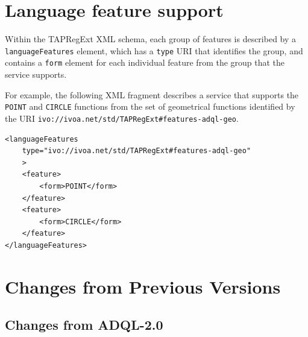 \documentclass[11pt,a4paper]{ivoa}
\begin{document}
\section{Language feature support}
\label{sec:features}

Within the TAPRegExt \citep{std:TAPREGEXT} XML schema, each group of features is
described by a \verb:languageFeatures: element, which has a \verb:type:
URI that identifies the group, and contains a \verb:form: element for each
individual feature from the group that the service supports.

For example, the following XML fragment describes a service that supports the
\verb:POINT: and \verb:CIRCLE: functions from the set of geometrical functions
identified by the URI \verb|ivo://ivoa.net/std/TAPRegExt#features-adql-geo|.

\begin{verbatim}
<languageFeatures
    type="ivo://ivoa.net/std/TAPRegExt#features-adql-geo"
    >
    <feature>
        <form>POINT</form>
    </feature>
    <feature>
        <form>CIRCLE</form>
    </feature>
</languageFeatures>    
\end{verbatim}

\section{Changes from Previous Versions}
\label{sec:changes}
\subsection{Changes from ADQL-2.0}
\end{document}
